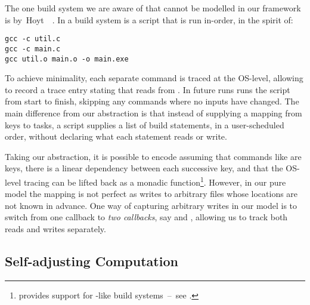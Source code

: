 The one build system we are aware of that cannot be modelled in our framework is
\Fabricate by~Hoyt~\etal~. In \Fabricate a build system is
a script that is run in-order, in the spirit of:

\vspace{1mm}
\begin{verbatim}
gcc -c util.c
gcc -c main.c
gcc util.o main.o -o main.exe
\end{verbatim}
\vspace{1mm}

\noindent
To achieve minimality, each separate command is traced at the OS-level, allowing
\Fabricate to record a trace entry stating that  reads from
. In future runs \Fabricate runs the script from start to finish,
skipping any commands where no inputs have changed. The main difference from our
 abstraction is that instead of supplying a mapping from keys to
tasks, a \Fabricate script supplies a list of build statements, in a
user-scheduled order, without declaring what each statement reads or write.

Taking our abstraction, it is possible to encode \Fabricate assuming that
commands like  are keys, there is a linear dependency between
each successive key, and that the OS-level tracing can be lifted back as a
monadic  function\footnote{\Shake provides support for
\Fabricate{}-like build systems~--~see .}.
However, in our pure model the mapping is not perfect as  writes to
arbitrary files whose locations are not known in advance. One way of capturing
arbitrary writes in our model is to switch from one callback  to
\emph{two callbacks}, say  and , allowing us to track both
reads and writes separately.

\subsection{Self-adjusting Computation}

